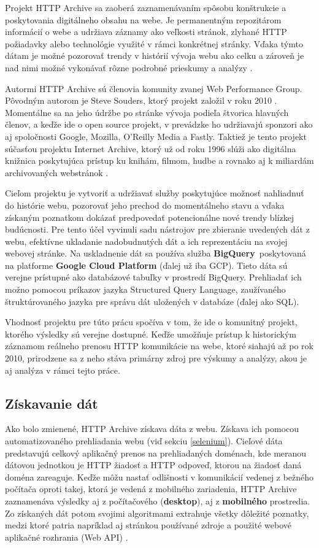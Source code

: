 Projekt HTTP Archive sa zaoberá zaznamenávaním spôsobu konštrukcie a poskytovania digitálneho obsahu na webe. Je permanentným repozitárom informácií o webe a udržiava záznamy ako veľkosti
stránok, zlyhané HTTP požiadavky alebo technológie využité v rámci konkrétnej stránky. Vďaka týmto dátam je možné pozorovať trendy v histórií vývoja webu ako celku a zároveň je nad nimi možné vykonávať
rôzne podrobné prieskumy a analýzy \cite{httparchive-about}. 

Autormi HTTP Archive sú členovia komunity zvanej Web Performance Group. Pôvodným autorom je Steve Souders, ktorý projekt založil v roku 2010 \cite{httparchive-faq}.
Momentálne sa na jeho údržbe po stránke vývoja podieľa štvorica hlavných členov, a keďže ide o open source projekt, v prevádzke ho udržiavajú sponzori ako aj spoločnosti Google, Mozilla, O'Reilly Media a Fastly.
Taktiež je tento projekt súčasťou projektu Internet Archive, ktorý už od roku 1996 slúži ako digitálna knižnica poskytujúca prístup ku knihám, filmom, hudbe a rovnako aj k miliardám archivovaných webstránok \cite{httparchive-about}.

Cieľom projektu je vytvoriť a udržiavať služby poskytujúce možnosť nahliadnuť do histórie webu, pozorovať jeho prechod do momentálneho stavu a vďaka získaným poznatkom dokázať
predpovedať potencionálne nové trendy blízkej budúcnosti. 
Pre tento účel vyvinuli sadu nástrojov pre zbieranie uvedených dát z webu, efektívne ukladanie nadobudnutých dát a ich reprezentáciu na svojej webovej stránke.
Na uskladnenie dát sa používa služba \mbox{\textbf{BigQuery} poskytovaná} na platforme \textbf{Google Cloud Platform} (ďalej už iba GCP).
Tieto dáta sú verejne prístupné ako databázové tabuľky v prostredí BigQuery.
Prehliadať ich možno pomocou príkazov jazyka Structured Query Language, zaužívaného štruktúrovaného jazyka pre správu dát uložených v databáze (ďalej ako SQL).

Vhodnosť projektu pre túto prácu spočíva v tom, že ide o komunitný projekt, ktorého výsledky sú verejne dostupné. 
Keďže umožňuje prístup k historickým záznamom reálneho prenosu HTTP komunikácie na webe, ktoré siahajú až po rok 2010, prirodzene sa z neho stáva primárny zdroj pre výskumy a analýzy, akou je aj analýza v rámci tejto práce.


\subsection{Získavanie dát}
\label{fetching-data}

Ako bolo zmienené, HTTP Archive získava dáta z webu. 
Získava ich pomocou automatizovaného prehliadania webu (viď sekciu \ref{selenium}).
Cieľové dáta predstavujú celkový aplikačný prenos na prehliadaných doménach, kde meranou dátovou jednotkou je HTTP žiadosť a HTTP odpoveď, ktorou na žiadosť daná doména zareaguje.
Keďže môžu nastať odlišnosti v komunikácií vedenej z bežného počítača oproti takej, ktorá je vedená z mobilného zariadenia, HTTP Archive zaznamenáva výsledky aj z počítačového (\textbf{desktop}), aj z \textbf{mobilného} prostredia.
Zo získaných dát potom svojimi algoritmami extrahuje všetky dôležité poznatky, medzi ktoré patria napríklad aj stránkou používané zdroje a použité webové aplikačné rozhrania (Web API) \cite{httparchive-homepage}.

